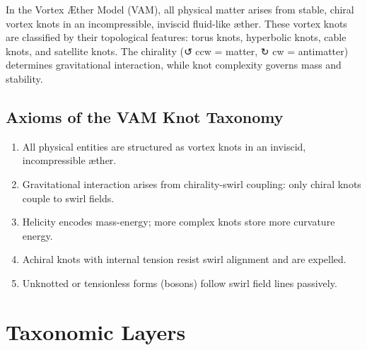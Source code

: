 In the Vortex Æther Model (VAM), all physical matter arises from stable, chiral vortex knots in an incompressible, inviscid fluid-like æther. These vortex knots are classified by their topological features: torus knots, hyperbolic knots, cable knots, and satellite knots. The chirality (↺ ccw = matter, ↻ cw = antimatter) determines gravitational interaction, while knot complexity governs mass and stability.

\subsection*{Axioms of the VAM Knot Taxonomy}
\begin{enumerate}
    \item All physical entities are structured as vortex knots in an inviscid, incompressible æther.
    \item Gravitational interaction arises from chirality-swirl coupling: only chiral knots couple to swirl fields.
    \item Helicity encodes mass-energy; more complex knots store more curvature energy.
    \item Achiral knots with internal tension resist swirl alignment and are expelled.
    \item Unknotted or tensionless forms (bosons) follow swirl field lines passively.
\end{enumerate}

\begin{center}
\end{center}

\section*{Taxonomic Layers}

